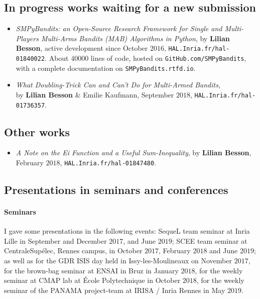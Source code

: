 \subsection{In progress works waiting for a new submission}

\begin{itemize}
\item
    \emph{SMPyBandits: an Open-Source Research Framework for Single and Multi-Players Multi-Arms Bandits (MAB) Algorithms in Python},
    by \textbf{Lilian Besson}, active development since October $2016$,
    \texttt{HAL.Inria.fr/hal-01840022}.
    About $40000$ lines of code, hosted on \texttt{GitHub.com/SMPyBandits},
    with a complete documentation on \texttt{SMPyBandits.rtfd.io}.
    \cite{SMPyBandits,SMPyBanditsJMLR}

\item
    \emph{What Doubling-Trick Can and Can't Do for Multi-Armed Bandits},\\
    by \textbf{Lilian Besson} \& Emilie Kaufmann, September $2018$,
    \texttt{HAL.Inria.fr/hal-01736357}.
    \cite{Besson2018DoublingTricks}

\end{itemize}


\subsection{Other works}

\begin{itemize}
\item
    \emph{A Note on the Ei Function and a Useful Sum-Inequality},
    by \textbf{Lilian Besson},
    February $2018$,
    \texttt{HAL.Inria.fr/hal-01847480}.

\end{itemize}


\subsection{Presentations in seminars and conferences}

\paragraph{Seminars}
    I gave some presentations in the following events:
    SequeL team seminar at Inria Lille in September and December $2017$, and June $2019$;
    SCEE team seminar at CentraleSupélec, Rennes campus, in October $2017$, February $2018$ and June $2019$;
    as well as
    for the GDR ISIS day held in Issy-les-Moulineaux on November $2017$,
    for the brown-bag seminar at ENSAI in Bruz in January $2018$,
    for the weekly seminar at CMAP lab at École Polytechnique in October $2018$,
    for the weekly seminar of the PANAMA project-team at IRISA / Inria Rennes in May $2019$.

